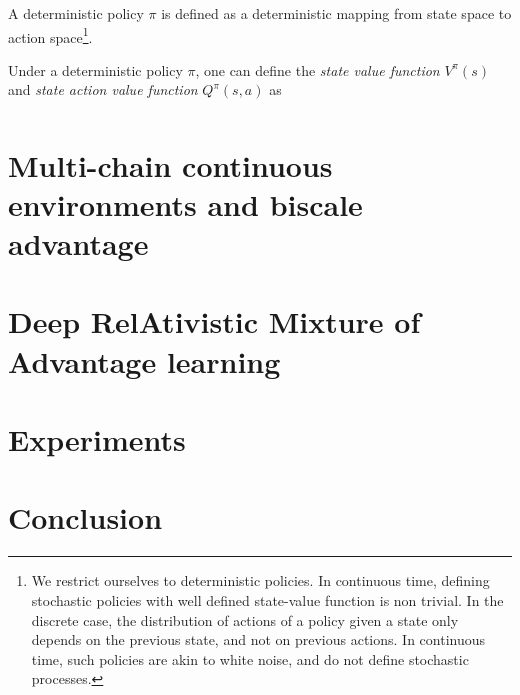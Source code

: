 \documentclass{article}
\begin{document}
A deterministic policy $\pi$ is defined as a deterministic mapping from state
space to action space\footnote{We restrict ourselves to deterministic policies.
	In continuous time, defining stochastic policies with well defined
	state-value function is non trivial. In the discrete case, the
distribution of actions of a policy given a state only depends on the previous
state, and not on previous actions. In continuous time, such policies are akin
to white noise, and do not define stochastic processes.}.

Under a deterministic policy $\pi$, one can define the \emph{state value function} $V^\pi(s)$
and \emph{state action value function} $Q^\pi(s, a)$ as
\begin{align}

\end{align}

\section{Multi-chain continuous environments and biscale advantage}
\label{sec:multi-chain}

\section{Deep RelAtivistic Mixture of Advantage learning}
\label{sec:algo}

\section{Experiments}
\label{sec:exp}

\section{Conclusion}
\label{sec:concl}



\end{document}
